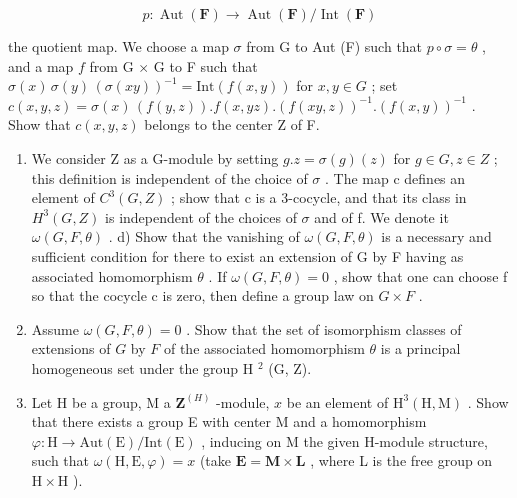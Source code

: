 \[
p: \operatorname{Aut} (\mathbf {F}) \rightarrow \operatorname{Aut} (\mathbf {F}) / \operatorname{Int} (\mathbf {F})
\]

the quotient map. We choose a map \(\sigma\) from G to Aut (F) such that \(p \circ \sigma = \theta\) , and a map \(f\) from G \(\times\) G to F such that \(\sigma(x)\, \sigma(y)\, (\sigma(xy))^{-1} = \text{Int}(f(x,y))\) for \(x,y \in G\) ; set \(c(x,y,z) = \sigma(x)\, (f(y,z)).f(x,yz).(f(xy,z))^{-1}.(f(x,y))^{-1}\) . Show that \(c(x,y,z)\) belongs to the center Z of F.

\begin{enumerate}
\def\labelenumi{\alph{enumi})}
\setcounter{enumi}{2}
\item
  We consider Z as a G-module by setting \(g . z = \sigma(g) (z)\) for \(g \in G, z \in Z\) ; this definition is independent of the choice of \(\sigma\) . The map c defines an element of \(C^{3}(G, Z)\) ; show that c is a 3-cocycle, and that its class in \(H^{3}(G, Z)\) is independent of the choices of \(\sigma\) and of f. We denote it \(\omega(G, F, \theta)\) . d) Show that the vanishing of \(\omega(G, F, \theta)\) is a necessary and sufficient condition for there to exist an extension of G by F having as associated homomorphism \(\theta\) . If \(\omega(G, F, \theta) = 0\) , show that one can choose f so that the cocycle c is zero, then define a group law on \(G \times F\) .
\item
  Assume \(\omega(G, F, \theta) = 0\) . Show that the set of isomorphism classes of extensions of \(G\) by \(F\) of the associated homomorphism \(\theta\) is a principal homogeneous set under the group H \(^{2}\) (G, Z).
\item
  Let H be a group, M a \(\mathbf{Z}^{(H)}\) -module, \(x\) be an element of \(\mathrm{H}^3 (\mathrm{H},\mathrm{M})\) . Show that there exists a group E with center M and a homomorphism \(\varphi :\mathrm{H}\to \mathrm{Aut}(\mathrm{E}) / \mathrm{Int}(\mathrm{E})\) , inducing on M the given H-module structure, such that \(\omega (\mathrm{H},\mathrm{E},\varphi) = x\) (take \(\mathbf{E} = \mathbf{M}\times \mathbf{L}\) , where L is the free group on \(\mathrm{H}\times \mathrm{H}\) ).
\end{enumerate}

